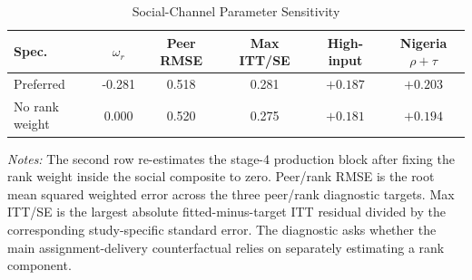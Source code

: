 \begin{table}[H]
\centering
\caption{Social-Channel Parameter Sensitivity}
\label{tab:struct_social_channel_sensitivity}
\begin{threeparttable}
\footnotesize
\begin{tabular}[t]{lccccc}
\toprule
Spec. & $\omega_r$ & Peer RMSE & Max ITT/SE & High-input & Nigeria $\rho+\tau$ \\
\midrule
Preferred & -0.281 & 0.518 & 0.281 & $+0.187$ & $+0.203$ \\
No rank weight & 0.000 & 0.520 & 0.275 & $+0.181$ & $+0.194$ \\
\bottomrule
\end{tabular}
\begin{tablenotes}
\footnotesize
\item \textit{Notes:} The second row re-estimates the stage-4 production block after fixing the rank weight inside the social composite to zero. Peer/rank RMSE is the root mean squared weighted error across the three peer/rank diagnostic targets. Max ITT/SE is the largest absolute fitted-minus-target ITT residual divided by the corresponding study-specific standard error. The diagnostic asks whether the main assignment-delivery counterfactual relies on separately estimating a rank component.
\end{tablenotes}
\end{threeparttable}
\end{table}
